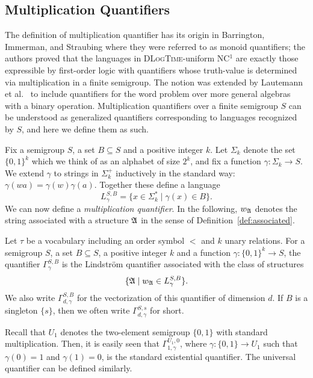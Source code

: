 \documentclass[a4paper,UKenglish,cleveref, autoref, thm-restate, anonymous]{lipics-v2021}
\begin{document}
\subsection{Multiplication Quantifiers}

The definition of multiplication quantifier has its origin in Barrington, Immerman, and Straubing \cite[Section 5]{barrington1990uniformity} where they were referred to as monoid quantifiers; the authors proved that the languages in \textsc{DLogTime}-uniform NC${}^1$ are exactly those expressible by first-order logic with quantifiers whose truth-value is determined via multiplication in a finite semigroup.  The notion was extended by Lautemann et al.~\cite{lautemann2001descriptive} to include quantifiers for the word problem over more general algebras with a binary operation.  Multiplication quantifiers over a finite semigroup $S$ can be understood as generalized quantifiers corresponding to languages recognized by $S$, and here we define them as such.

Fix a semigroup $S$, a set $B \subseteq S$ and a positive integer $k$.  Let $\Sigma_k$ denote the set $\{0,1\}^k$ which we think of as an alphabet of size $2^k$, and fix a function $\gamma: \Sigma_k \rightarrow S$.  We extend $\gamma$ to strings in $\Sigma_k^+$ inductively in the standard way: $\gamma(wa) = \gamma(w)\gamma(a)$.  Together these define a language
$$L^{S,B}_{\gamma} = \{ x \in \Sigma_k^* \mid \gamma(x) \in B\}.$$
We can now define a \emph{multiplication quantifier}.  In the following, $w_{\mathfrak{A}}$ denotes the string associated with a structure $\mathfrak{A}$ in the sense of Definition~\ref{def:associated}.
\begin{definition}\label{def:multquant}
Let $\tau$ be a vocabulary including an order symbol $<$ and $k$ unary relations.
For a semigroup $S$, a set $B \subseteq S$, a positive integer $k$ and a function $\gamma: \{0,1\}^k \rightarrow S$, the quantifier $\Gamma_{\gamma}^{S,B}$ is the Lindstr\"om quantifier associated with the class of structures
$$\{ \mathfrak{A} \mid w_{\mathfrak{A}} \in L^{S,B}_{\gamma}\}.$$
We also write $\Gamma_{d,\gamma}^{S,B}$ for the vectorization of this quantifier of dimension $d$. If $B$ is a singleton $\{s\}$, then we often write $\Gamma^{S,s}_{d,\gamma}$ for short.
\end{definition}

Recall that $U_1$ denotes the two-element semigroup $\{0,1\}$ with standard multiplication.  Then, it is easily seen that $\Gamma^{U_1,0}_{1,\gamma}$,  where $\gamma : \{0,1\} \rightarrow U_1$ such that $\gamma(0) = 1$ and $\gamma(1) = 0$, is the standard existential quantifier.  The universal quantifier can be defined similarly.
\end{document}
